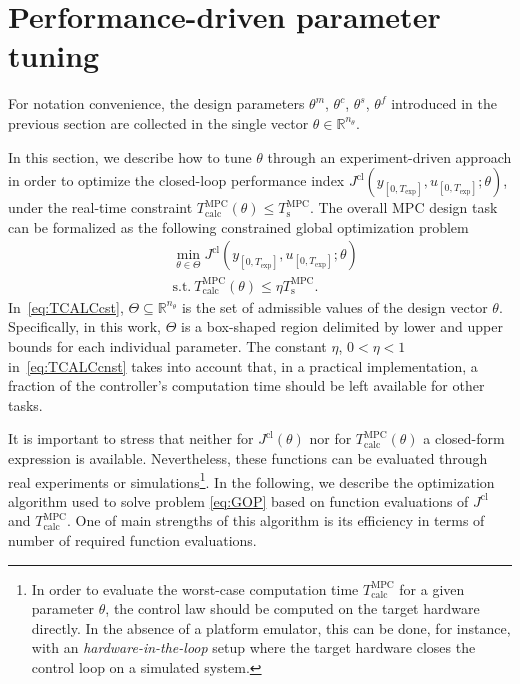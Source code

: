 \documentclass{article}
\newcommand{\Texp}{T_{\mathrm{exp}}}
\newcommand{\TMPC}{T_{\mathrm{s}}^{\mathrm{MPC}}}
\newcommand{\TCALCMPC}{T_{\mathrm{calc}}^{\mathrm{MPC}}}
\newcommand{\JC}{{J^\mathrm{cl}}}
\newcommand{\ntheta}{n_\theta}
\begin{document}
\section{Performance-driven parameter tuning}\label{sec:main}

For notation convenience, the design parameters $\theta^m$, $\theta^c$, $\theta^s$, $\theta^f$ introduced in the previous section are collected in the single vector $\theta \in \mathbb{R}^{\ntheta}$.

In this section, we describe how to tune $\theta$ through an experiment-driven approach in order to optimize the closed-loop performance index $\JC(y_{[0,\Texp]},u_{[0,\Texp]}; \theta)$, under the real-time constraint $\TCALCMPC(\theta) \leq \TMPC$.
The overall MPC design task can be formalized as the following constrained global 
optimization problem
\begin{subequations} 
\label{eq:GOP}
	\begin{align} 
	&   \min_{\theta \in \Theta}{\JC(y_{[0,\Texp]},u_{[0,\Texp]}; \theta)} \label{eq:TCALCcst} \\ 
	&  \mathrm{s.t. \ }   \TCALCMPC(\theta) \leq \eta \TMPC. \label{eq:TCALCcnst}
	\end{align}
\end{subequations}
In~\eqref{eq:TCALCcst}, $\Theta \subseteq \mathbb{R}^{\ntheta}$ is the set of admissible values  of the design vector $\theta$. Specifically, in this work, $\Theta$ is a box-shaped region  delimited by lower and upper bounds for each individual parameter.
The constant $\eta$, $0<\eta<1$ in~\eqref{eq:TCALCcnst} takes into account that, in a practical implementation, a fraction of the controller's computation time should be left available for other tasks. %

It is important to stress that neither for $\JC(\theta)$ nor for $\TCALCMPC(\theta)$ a closed-form expression is available.  
Nevertheless, these functions can be evaluated through real experiments or simulations\footnote{In order to evaluate the worst-case computation time $\TCALCMPC$ for a given parameter $\theta$, the control law should be computed on the target hardware directly. In the absence of a platform emulator, this can be done, for instance, with an \emph{hardware-in-the-loop} setup where the target hardware closes the control loop on a simulated system.}.
In the following, we describe the optimization algorithm used to solve problem \eqref{eq:GOP} based on function evaluations of $\JC$ and $\TCALCMPC$. 
One of main strengths of this algorithm is its efficiency in terms of number of required 
function evaluations.
\end{document}
